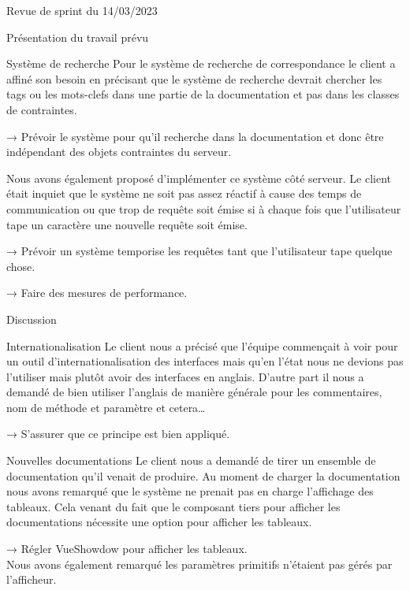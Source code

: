 \documentclass[]{article}
\begin{document}
{\begin{section}{Revue de sprint du 14/03/2023}
 \begin{subsection}{Présentation du travail prévu}
     \begin{subsubsection}{Système de recherche}
         Pour le système de recherche de correspondance le client a affiné son besoin en précisant que le système de recherche devrait chercher les tags ou les mots-clefs dans une partie de la documentation et pas dans les classes de contraintes.

         → Prévoir le système pour qu’il recherche dans la documentation et donc être indépendant des objets contraintes du serveur.

         Nous avons également proposé d’implémenter ce système côté serveur. Le client était inquiet que le système ne soit pas assez réactif à cause des temps de communication ou que trop de requête soit émise si à chaque fois que l’utilisateur tape un caractère une nouvelle requête soit émise.

         → Prévoir un système temporise les requêtes tant que l’utilisateur tape quelque chose.

         → Faire des mesures de performance.
     \end{subsubsection}
 \end{subsection}

 \begin{subsection}{Discussion}
     \begin{subsubsection}{Internationalisation}
         Le client nous a précisé que l’équipe commençait à voir pour un outil d’internationalisation des interfaces mais qu’en l’état nous ne devions pas l’utiliser mais plutôt avoir des interfaces en anglais. D’autre part il nous a demandé de bien utiliser l’anglais de manière générale pour les commentaires, nom de méthode et paramètre et cetera…

         → S’assurer que ce principe est bien appliqué.
     \end{subsubsection}

     \begin{subsubsection}{Nouvelles documentations}
         Le client nous a demandé de tirer un ensemble de documentation qu’il venait de produire. Au moment de charger la documentation nous avons remarqué que le système ne prenait pas en charge l’affichage des tableaux. Cela venant du fait que le composant tiers pour afficher les documentations nécessite une option pour afficher les tableaux.

         → Régler VueShowdow pour afficher les tableaux.
         \\[5mm]
         Nous avons également remarqué les paramètres primitifs n’étaient pas gérés par l’afficheur.


\end{subsubsection}
\end{subsection}
\end{section}}
\end{document}
